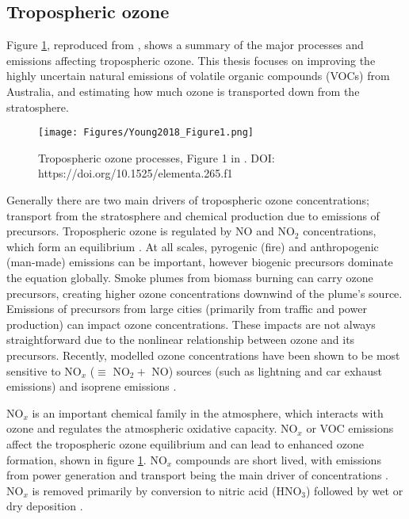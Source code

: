   
  \subsection{Tropospheric ozone}
    Figure \ref{LR:O3:fig_YoungOzoneSummary}, reproduced from \textcite{Young2018}, shows a summary of the major processes and emissions affecting tropospheric ozone.
    This thesis focuses on improving the highly uncertain natural emissions of volatile organic compounds (VOCs) from Australia, and estimating how much ozone is transported down from the stratosphere.
    
    \begin{figure}
      \texttt{[image: Figures/Young2018\_Figure1.png]}
      \caption{%
        Tropospheric ozone processes, Figure 1 in \textcite{Young2018}.
        DOI: https://doi.org/10.1525/elementa.265.f1
      }
      \label{LR:O3:fig_YoungOzoneSummary}
    \end{figure}
  
    Generally there are two main drivers of tropospheric ozone concentrations; transport from the stratosphere and chemical production due to emissions of precursors. 
    Tropospheric ozone is regulated by NO and NO$_2$ concentrations, which form an equilibrium \parencite{Cape2008,Young2018}.
    At all scales, pyrogenic (fire) and anthropogenic (man-made) emissions can be important, however biogenic precursors dominate the equation globally.
    Smoke plumes from biomass burning can carry ozone precursors, creating higher ozone concentrations downwind of the plume's source.
    Emissions of precursors from large cities (primarily from traffic and power production) can impact ozone concentrations.
    These impacts are not always straightforward due to the nonlinear relationship between ozone and its precursors.
    Recently, modelled ozone concentrations have been shown to be most sensitive to NO$_x$ ($\equiv $ NO$_2 +$ NO) sources (such as lightning and car exhaust emissions) and isoprene emissions \parencite{Christian2018}.
    
    NO$_x$ is an important chemical family in the atmosphere, which interacts with ozone and regulates the atmospheric oxidative capacity.
    NO$_x$ or VOC emissions affect the tropospheric ozone equilibrium and can lead to enhanced ozone formation, shown in figure \ref{LR:O3:fig_YoungOzoneSummary}.
    NO$_x$ compounds are short lived, with emissions from power generation and transport being the main driver of concentrations \parencite{Delmas1997}.
    NO$_x$ is removed primarily by conversion to nitric acid (HNO$_3$) followed by wet or dry deposition \parencite{Ayers2006}.
    
